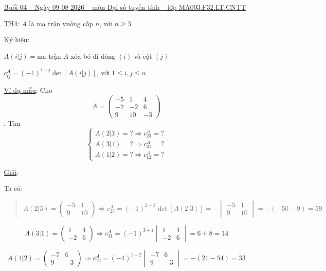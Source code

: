 \documentclass[
]{article}
\author{}
\date{}
\let\ul\uline
\begin{document}
\ul{Buổi 04 -- Ngày 09-08-2026 -- môn Đại số tuyến tính -- lớp
MA003.F32.LT.CNTT}

\ul{TH4}: $A$ là ma
trận vuông cấp $n$,
với $n \ge 3$

\ul{Ký hiệu}:

$A(i|j) =$ma trận
$A$ xóa bỏ đi dòng
$(i)$ và cột
$(j)$

$c_{ij}^A = (-1)^{i+j} \det[A(i|j)]$, với
$1 \le i, j \le n$

\ul{Ví dụ mẫu}: Cho
$$A = \begin{pmatrix} -5 & 1 & 4 \\ -7 & -2 & 6 \\ 9 & 10 & -3 \end{pmatrix}$$. Tìm
$$\begin{cases} A(2|3) =? \Rightarrow c_{23}^A =? \\ A(3|1) =? \Rightarrow c_{31}^A =? \\ A(1|2) =? \Rightarrow c_{12}^A =? \end{cases}$$

\ul{Giải}:

Ta có:

\begin{quote}
$$A(2|3) = \begin{pmatrix} -5 & 1 \\ 9 & 10 \end{pmatrix} \Rightarrow c_{23}^A = (-1)^{2+3} \det[A(2|3)] = - \begin{vmatrix} -5 & 1 \\ 9 & 10 \end{vmatrix} = -(-50-9) = 59$$
\end{quote}

$$A(3|1) = \begin{pmatrix} 1 & 4 \\ -2 & 6 \end{pmatrix} \Rightarrow c_{31}^A = (-1)^{3+1} \begin{vmatrix} 1 & 4 \\ -2 & 6 \end{vmatrix} = 6+8=14$$

$$A(1|2) = \begin{pmatrix} -7 & 6 \\ 9 & -3 \end{pmatrix} \Rightarrow c_{12}^A = (-1)^{1+2} \begin{vmatrix} -7 & 6 \\ 9 & -3 \end{vmatrix} = -(21-54)=33$$
\end{document}
